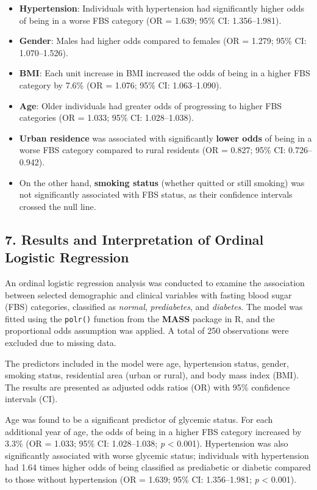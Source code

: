 \documentclass[
  letterpaper,
  DIV=11,
  numbers=noendperiod]{scrartcl}
\makeatletter
\newcommand*\pandocbounded[1]{%
  \sbox\pandoc@box{#1}%
  \Gscale@div\@tempa{\textheight}{\dimexpr\ht\pandoc@box+\dp\pandoc@box\relax}%
  \Gscale@div\@tempb{\linewidth}{\wd\pandoc@box}%
  \ifdim\@tempb\p@<\@tempa\p@\let\@tempa\@tempb\fi%
  \ifdim\@tempa\p@<\p@\scalebox{\@tempa}{\usebox\pandoc@box}%
  \else\usebox{\pandoc@box}%
  \fi%
}
\makeatother
\begin{document}
\begin{itemize}
\item
  \textbf{Hypertension}: Individuals with hypertension had significantly
  higher odds of being in a worse FBS category (OR = 1.639; 95\% CI:
  1.356--1.981).
\item
  \textbf{Gender}: Males had higher odds compared to females (OR =
  1.279; 95\% CI: 1.070--1.526).
\item
  \textbf{BMI}: Each unit increase in BMI increased the odds of being in
  a higher FBS category by 7.6\% (OR = 1.076; 95\% CI: 1.063--1.090).
\item
  \textbf{Age}: Older individuals had greater odds of progressing to
  higher FBS categories (OR = 1.033; 95\% CI: 1.028--1.038).
\item
  \textbf{Urban residence} was associated with significantly
  \textbf{lower odds} of being in a worse FBS category compared to rural
  residents (OR = 0.827; 95\% CI: 0.726--0.942).
\item
  On the other hand, \textbf{smoking status} (whether quitted or still
  smoking) was not significantly associated with FBS status, as their
  confidence intervals crossed the null line.
\end{itemize}

\subsection{7. Results and Interpretation of Ordinal Logistic
Regression}\label{results-and-interpretation-of-ordinal-logistic-regression}

\pandocbounded{\texttt{[image: images/clipboard-3248233147.png]}}

An ordinal logistic regression analysis was conducted to examine the
association between selected demographic and clinical variables with
fasting blood sugar (FBS) categories, classified as \emph{normal},
\emph{prediabetes}, and \emph{diabetes}. The model was fitted using the
\texttt{polr()} function from the \textbf{MASS} package in R, and the
proportional odds assumption was applied. A total of 250 observations
were excluded due to missing data.

The predictors included in the model were age, hypertension status,
gender, smoking status, residential area (urban or rural), and body mass
index (BMI). The results are presented as adjusted odds ratios (OR) with
95\% confidence intervals (CI).

Age was found to be a significant predictor of glycemic status. For each
additional year of age, the odds of being in a higher FBS category
increased by 3.3\% (OR = 1.033; 95\% CI: 1.028--1.038; \emph{p}
\textless{} 0.001). Hypertension was also significantly associated with
worse glycemic status; individuals with hypertension had 1.64 times
higher odds of being classified as prediabetic or diabetic compared to
those without hypertension (OR = 1.639; 95\% CI: 1.356--1.981; \emph{p}
\textless{} 0.001).
\end{document}
